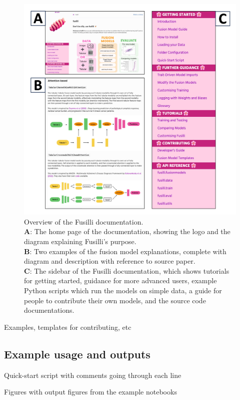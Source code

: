 \begin{figure}
    \centering
    \includegraphics[width=1\linewidth]{figures/fusilli_documentation}
    \caption{Overview of the Fusilli documentation. \\
    \textbf{A}: The home page of the documentation, showing the logo and the diagram explaining Fusilli's purpose.\\
    \textbf{B}: Two examples of the fusion model explanations, complete with diagram and description with reference to source paper. \\
    \textbf{C}: The sidebar of the Fusilli documentation, which shows tutorials for getting started, guidance for more advanced users, example Python scripts which run the models on simple data, a guide for people to contribute their own models, and the source code documentations.
    }
    \label{fig:fusillidocs}
\end{figure}

Examples, templates for contributing, etc


\subsection{Example usage and outputs}
Quick-start script with comments going through each line

Figures with output figures from the example notebooks

